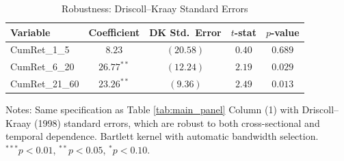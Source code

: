 \begin{table}[htbp]\centering
\caption{Robustness: Driscoll--Kraay Standard Errors}
\label{tab:driscoll_kraay}
\begin{tabular}{lcccc}
\toprule
Variable & Coefficient & DK Std.\ Error & $t$-stat & $p$-value \\
\midrule
CumRet\_1\_5 & $8.23$ & $(20.58)$ & $0.40$ & $0.689$ \\
CumRet\_6\_20 & $26.77^{**}$ & $(12.24)$ & $2.19$ & $0.029$ \\
CumRet\_21\_60 & $23.26^{**}$ & $(9.36)$ & $2.49$ & $0.013$ \\
\bottomrule
\end{tabular}
\begin{tablenotes}\small
\item Notes: Same specification as Table \ref{tab:main_panel} Column (1)
with Driscoll--Kraay (1998) standard errors, which are robust to both
cross-sectional and temporal dependence. Bartlett kernel with automatic
bandwidth selection.
$^{***}p<0.01$, $^{**}p<0.05$, $^{*}p<0.10$.
\end{tablenotes}
\end{table}